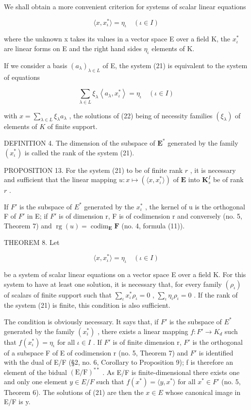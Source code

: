 We shall obtain a more convenient criterion for systems of scalar linear equations

\[
\langle x, x _ {\iota} ^ {*} \rangle = \eta_ {\iota} \quad (\iota \in I)\tag{21}
\]

where the unknown x takes its values in a vector space E over a field K, the \(x_{\iota}^{*}\) are linear forms on E and the right hand sides \(\eta_{\iota}\) elements of K.

If we consider a basis \((a_{\lambda})_{\lambda\in L}\) of E, the system (21) is equivalent to the system of equations

\[
\sum_ {\lambda \in L} \xi_ {\lambda} \left\langle a _ {\lambda}, x _ {\iota} ^ {*} \right\rangle = \eta_ {\iota} \quad (\iota \in I)\tag{22}
\]

with \(x = \sum_{\lambda \in L} \xi_{\lambda} a_{\lambda}\) , the solutions of (22) being of necessity families \((\xi_{\lambda})\) of elements of \(K\) of finite support.

DEFINITION 4. The dimension of the subspace of \(\mathbf{E}^*\) generated by the family \((x_{\iota}^{*})\) is called the rank of the system (21).

PROPOSITION 13. For the system (21) to be of finite rank \(r\) , it is necessary and sufficient that the linear mapping \(u: x \mapsto (\langle x, x_{\iota}^* \rangle)\) of \(\mathbf{E}\) into \(\mathbf{K}_s^I\) be of rank \(r\) .

If \(F'\) is the subspace of \(E^{*}\) generated by the \(x_{\iota}^{*}\) , the kernel of u is the orthogonal F of \(F'\) in E; if \(F'\) is of dimension r, F is of codimension r and conversely (no. 5, Theorem 7) and \(\operatorname{rg}(u) = \operatorname{codim}_{\mathbf{E}} \mathbf{F}\) (no. 4, formula (11)).

THEOREM 8. Let

\[
\langle x, x _ {\iota} ^ {*} \rangle = \eta_ {\iota} \quad (\iota \in I)\tag{21}
\]

be a system of scalar linear equations on a vector space E over a field K. For this system to have at least one solution, it is necessary that, for every family \((\rho_{\iota})\) of scalars of finite support such that \(\sum_{\iota} x_{\iota}^{*}\rho_{\iota}=0\) , \(\sum_{\iota}\eta_{\iota}\rho_{\iota}=0\) . If the rank of the system (21) is finite, this condition is also sufficient.

The condition is obviously necessary. It says that, if \(F'\) is the subspace of \(E^{*}\) generated by the family \((x_{i}^{*})\) , there exists a linear mapping \(f:F'\to K_{d}\) such that \(f(x_{\iota}^{*})=\eta_{\iota}\) for all \(\iota\in I\) . If \(F'\) is of finite dimension r, \(F'\) is the orthogonal of a subspace F of E of codimension r (no. 5, Theorem 7) and \(F'\) is identified with the dual of E/F (§2, no. 6, Corollary to Proposition 9); f is therefore an element of the bidual \((\mathrm{E}/\mathrm{F})^{**}\) . As E/F is finite-dimensional there exists one and only one element \(y\in E/F\) such that \(f(x^{*})=\langle y,x^{*}\rangle\) for all \(x^{*}\in F'\) (no. 5, Theorem 6). The solutions of (21) are then the \(x\in E\) whose canonical image in E/F is y.

